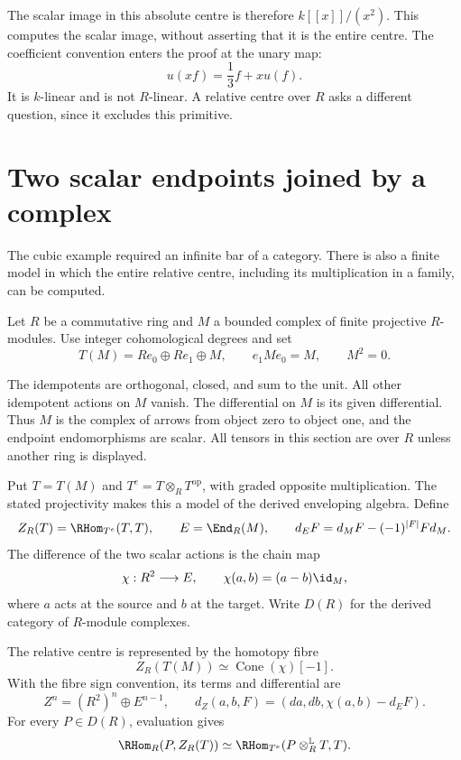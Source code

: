 The scalar image in this absolute centre is therefore
$k[[x]]/(x^2)$. This computes the scalar image, without asserting
that it is the entire centre. The coefficient convention enters
the proof at the unary map:
\[
 u(xf)=\frac13f+xu(f).
\]
It is $k$-linear and is not $R$-linear. A relative centre over
$R$ asks a different question, since it excludes this primitive.

\section{Two scalar endpoints joined by a complex}
\label{sec:vol2-triangular-centre}

The cubic example required an infinite bar of a category.
There is also a finite model in which the entire relative centre,
including its multiplication in a family, can be computed.

Let $R$ be a commutative ring and $M$ a bounded complex of finite
projective $R$-modules. Use integer cohomological degrees and set
\begin{equation}\label{eq:vol2-triangular-algebra}
 T(M)=Re_0\oplus Re_1\oplus M,
 \qquad e_1Me_0=M,
 \qquad M^2=0.
\end{equation}

The idempotents are orthogonal, closed, and sum to the unit.
All other idempotent actions on $M$ vanish. The differential on
$M$ is its given differential. Thus $M$ is the complex of arrows
from object zero to object one, and the endpoint endomorphisms
are scalar. All tensors in this section are over $R$ unless
another ring is displayed.

Put $T=T(M)$ and $T^e=T\otimes_R T^{\mathrm{op}}$, with graded
opposite multiplication. The stated projectivity makes this a
model of the derived enveloping algebra. Define
\[
 Z_R(T)=\RHom_{T^e}(T,T),
 \qquad
 E=\End_R(M),
 \qquad d_EF=d_MF-(-1)^{|F|}Fd_M.
\]
The difference of the two scalar actions is the chain map
\[
 \chi:R^2\longrightarrow E,
 \qquad \chi(a,b)=(a-b)\id_M,
\]
where $a$ acts at the source and $b$ at the target.
Write $D(R)$ for the derived category of $R$-module complexes.

\begin{theorem}\label{thm:vol2-triangular-cone}
The relative centre is represented by the homotopy fibre
\begin{equation}\label{eq:vol2-triangular-cone}
 Z_R(T(M))\simeq\operatorname{Cone}(\chi)[-1].
\end{equation}
With the fibre sign convention, its terms and differential are
\[
 Z^n=(R^2)^n\oplus E^{n-1},
 \qquad d_Z(a,b,F)=(da,db,\chi(a,b)-d_EF).
\]
For every $P\in D(R)$, evaluation gives
\begin{equation}\label{eq:vol2-relative-evaluation}
 \RHom_R(P,Z_R(T))
 \simeq\RHom_{T^e}(P\otimes_R^{\mathbb L}T,T).
\end{equation}
\end{theorem}

